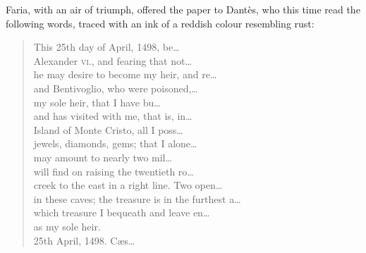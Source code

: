  Faria, with an air of triumph, offered the paper to Dantès, who this time read the following words, traced with an ink of a reddish colour resembling rust:  
\begin{letter}
\begin{quotation}\raggedright\oldfont

	This 25th day of April, 1498, be\dots \\      
	Alexander \textsc{vi.}, and fearing that not\dots \\      
	he may desire to become my heir, and re\dots \\      
	and Bentivoglio, who were poisoned,\dots \\      
	my sole heir, that I have bu\dots \\      
	and has visited with me, that is, in\dots \\      
	Island of Monte Cristo, all I poss\dots \\      
	jewels, diamonds, gems; that I alone\dots \\      
	may amount to nearly two mil\dots \\      
	will find on raising the twentieth ro\dots \\      
	creek to the east in a right line. Two open\dots \\      
	in these caves; the treasure is in the furthest a\dots \\      
	which treasure I bequeath and leave en\dots \\      
	as my sole heir.\\      
	25th April, 1498.\hspace{2em} Cæs\dots  
 \end{quotation}

\end{letter}

